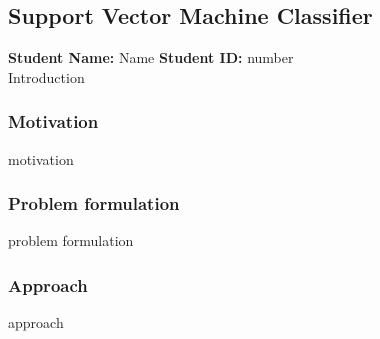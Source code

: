 \subsection{Support Vector Machine Classifier}
\textbf{Student Name: }Name \textbf{Student ID:} number\\
Introduction
\subsubsection*{Motivation}
motivation
\subsubsection*{Problem formulation}
problem formulation
\subsubsection*{Approach}
approach
